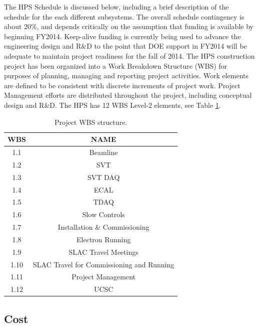 The HPS Schedule is discussed below, including a brief description of the schedule for the each 
different subsystems. The overall schedule contingency is about 20\%, and depends critically on the assumption that 
funding is available by beginning FY2014. Keep-alive funding is currently being used to advance the engineering design and R\&D to the point
that DOE support in FY2014 will be adequate to maintain project readiness for the fall of 2014. The HPS construction project has been organized 
into a Work Breakdown Structure (WBS) for purposes of planning, 
managing and reporting project activities. Work elements are defined to be consistent with discrete increments of project work. 
Project Management efforts are distributed throughout the project, including conceptual design and R\&D. The HPS has 12 WBS
 Level-2 elements, see Table \ref{tb:wbs}. 

\begin{table}[htdp]
\caption{Project WBS structure.}
\begin{center}
\begin{tabular}{|c|c|}
\hline
WBS& NAME \\
\hline\hline
1.1 & Beamline \\
\hline
1.2 & SVT \\
\hline
1.3 & SVT DAQ \\
\hline
1.4 & ECAL \\
\hline
1.5 & TDAQ \\
\hline
1.6 & Slow Controls \\
\hline
1.7 & Installation \& Commissioning \\
\hline
1.8 & Electron Running \\
\hline
1.9 & SLAC Travel Meetings \\
\hline
1.10 & SLAC Travel for Commissioning and Running \\
\hline
1.11 & Project Management  \\
\hline
1.12 & UCSC  \\
\hline
\hline
\end{tabular}
\end{center}
\label{tb:wbs}
\end{table}%

\subsection{Cost}

